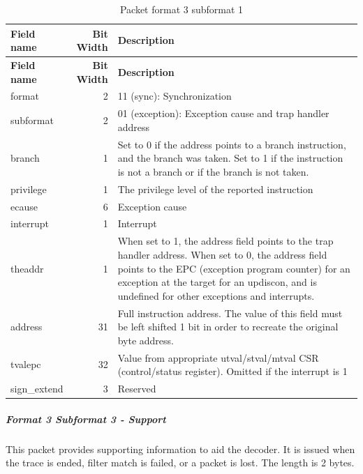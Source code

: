 \documentclass[main\_\_EN.tex]{subfiles}
\begin{document}
\begin{longtable}[c]{ |l|r|L{10cm}| }
    \caption{Packet format 3 subformat 1}
    \label{tab:f3s1}
    \\\hline{}
    \textbf{Field name} & \textbf{Bit Width} & \textbf{Description} \\\hline
    \endfirsthead
    \textbf{Field name} & \textbf{Bit Width} & \textbf{Description} \\\hline
    \endhead
    \endfoot
    \endlastfoot

    format & 2 & 11 (sync): Synchronization \\\hline
    subformat & 2 & 01 (exception): Exception cause and trap handler address \\\hline
    branch & 1 & Set to 0 if the address points to a branch instruction, and the branch was taken. Set to 1 if the instruction is not a branch or if the branch is not taken. \\\hline
    privilege & 1 & The privilege level of the reported instruction \\\hline
    ecause & 6 & Exception cause \\\hline
    interrupt & 1 & Interrupt \\\hline
    theaddr & 1 & When set to 1, the address field points to the trap handler address. When set to 0, the address field points to the EPC (exception program counter) for an exception at the target for an updiscon, and is undefined for other exceptions and interrupts. \\\hline
    address & 31 & Full instruction address. The value of this field must be left shifted 1 bit in order to recreate the original byte address. \\\hline
    tvalepc & 32 & Value from appropriate utval/stval/mtval CSR (control/status register). Omitted if the interrupt is 1 \\\hline
    sign\_extend & 3 & Reserved \\\hline
 \end{longtable}



\subparagraph{Format 3 Subformat 3 - Support}

This packet provides supporting information to aid the decoder. It is issued when the trace is ended, filter match is failed, or a packet is lost. The length is 2 bytes.
\end{document}

